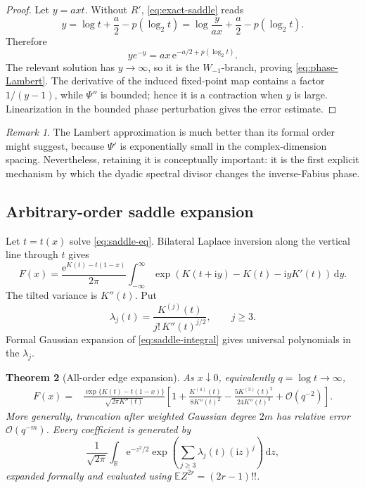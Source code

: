 \documentclass[11pt,oneside]{article}
\newtheorem{theorem}{Theorem}[section]
\theoremstyle{definition}
\theoremstyle{remark}
\newtheorem{remark}[theorem]{Remark}
\newcommand{\R}{\mathbb R}
\newcommand{\e}{\mathrm e}
\newcommand{\ii}{\mathrm i}
\newcommand{\dd}{\,\mathrm d}
\newcommand{\E}{\mathbb E}
\newcommand{\bigO}{\mathcal O}
\begin{document}
\begin{proof}
Let \(y=axt\).  Without \(R'\), \eqref{eq:exact-saddle} reads
\[
 y=\log t+\frac a2-p(\log_2t)
   =\log\frac{y}{ax}+\frac a2-p(\log_2t).
\]
Therefore
\[
 ye^{-y}=ax\,\e^{-a/2+p(\log_2t)}.
\]
The relevant solution has \(y\to\infty\), so it is the
\(W_{-1}\)-branch, proving \eqref{eq:phase-Lambert}.  The derivative of
the induced fixed-point map contains a factor \(1/(y-1)\), while
\(\Psi''\) is bounded; hence it is a contraction when \(y\) is large.
Linearization in the bounded phase perturbation gives the error estimate.
\end{proof}

\begin{remark}
The Lambert approximation is much better than its formal order might suggest,
because \(\Psi'\) is exponentially small in the complex-dimension spacing.
Nevertheless, retaining it is conceptually important: it is the first
explicit mechanism by which the dyadic spectral divisor changes the
inverse-Fabius phase.
\end{remark}

\subsection{Arbitrary-order saddle expansion}

Let \(t=t(x)\) solve \eqref{eq:saddle-eq}.  Bilateral Laplace inversion along
the vertical line through \(t\) gives
\[
 F(x)
 =\frac{\e^{K(t)-t(1-x)}}{2\pi}
  \int_{-\infty}^{\infty}
  \exp\!\left(
   K(t+\ii y)-K(t)-\ii yK'(t)
  \right)\dd y.
 \label{eq:saddle-integral}
\]
The tilted variance is \(K''(t)\).  Put
\[
 \lambda_j(t)=
 \frac{K^{(j)}(t)}{j!\,K''(t)^{j/2}},
 \qquad j\geq3.
\]
Formal Gaussian expansion of \eqref{eq:saddle-integral} gives universal
polynomials in the \(\lambda_j\).

\begin{theorem}[All-order edge expansion]
\label{thm:all-order-saddle}
As \(x\downarrow0\), equivalently \(q=\log t\to\infty\),
\begin{align}
 F(x)
 ={}&
 \frac{\exp\{K(t)-t(1-x)\}}
      {\sqrt{2\pi K''(t)}}
 \left[
  1+
  \frac{K^{(4)}(t)}{8K''(t)^2}
  -\frac{5K^{(3)}(t)^2}{24K''(t)^3}
  +\bigO(q^{-2})
 \right].
 \label{eq:first-saddle-correction}
\end{align}
More generally, truncation after weighted Gaussian degree \(2m\) has
relative error \(\bigO(q^{-m})\).  Every coefficient is generated by
\begin{equation}
 \frac1{\sqrt{2\pi}}
 \int_{\R}\e^{-z^2/2}
 \exp\!\left(
  \sum_{j\geq3}\lambda_j(t)(\ii z)^j
 \right)\dd z,
 \label{eq:Gaussian-generator}
\end{equation}
expanded formally and evaluated using
\(\E Z^{2r}=(2r-1)!!\).
\end{theorem}
\end{document}
